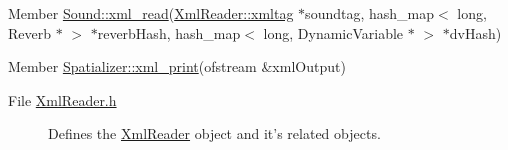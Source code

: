 \label{_deprecated000034}
\hypertarget{deprecated__deprecated000034}{}
 \begin{description}
\item[Member \hyperlink{classSound_a10}{Sound::xml\_\-read}(\hyperlink{classXmlReader_1_1xmltag}{Xml\-Reader::xmltag} $\ast$soundtag, hash\_\-map$<$ long, Reverb $\ast$ $>$ $\ast$reverb\-Hash, hash\_\-map$<$ long, Dynamic\-Variable $\ast$ $>$ $\ast$dv\-Hash) ]\end{description}


\label{_deprecated000035}
\hypertarget{deprecated__deprecated000035}{}
 \begin{description}
\item[Member \hyperlink{classSpatializer_a2}{Spatializer::xml\_\-print}(ofstream \&xml\-Output) ]\end{description}


\label{_deprecated000001}
\hypertarget{deprecated__deprecated000001}{}
 \begin{description}
\item[File \hyperlink{XmlReader_8h}{Xml\-Reader.h} ]Defines the \hyperlink{classXmlReader}{Xml\-Reader} object and it's related objects. \end{description}
